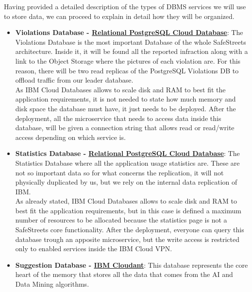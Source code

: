 Having provided a detailed description of the types of DBMS services we will use to store data, we can proceed to explain in detail how they will be organized.
\begin{itemize}
	\item \textbf{Violations Database - \href{https://cloud.ibm.com/catalog/services/databases-for-postgresql}{Relational PostgreSQL Cloud Database}}: The Violations Database is the most important Database of the whole SafeStreets architecture. Inside it, it will be found all the reported infraction along with a link to the Object Storage where the pictures of each violation are. For this reason, there will be two read replicas of the PostgreSQL Violations DB to offload traffic from our leader database. 
	\\As IBM Cloud Databases allows to scale disk and RAM to best fit the application requirements, it is not needed to state how much memory and disk space the database must have, it just needs to be deployed. After the deployment, all the microservice that needs to access data inside this database, will be given a connection string that allows read or read/write access depending on which service is.
	\begin{comment}
	\begin{figure}[h!]
		\makebox[\textwidth]{\texttt{[image: /images/microservices/postgres.png]}}
		\caption{Scalable SafeStreets architecture to handle millions of users.}
	\end{figure}
	\FloatBarrier
	\end{comment}
	\item \textbf{Statistics Database - \href{https://cloud.ibm.com/catalog/services/databases-for-postgresql}{Relational PostgreSQL Cloud Database}}: The Statistics Database where all the application usage statistics are. 
	These are not so important data so for what concerns the replication, it will not physically duplicated by us, but we rely on the internal data replication of IBM.
	\\As already stated, IBM Cloud Databases allows to scale disk and RAM to best fit the application requirements, but in this case is defined a maximum number of resources to be allocated because the statistics page is not a SafeStreets core functionality.
	After the deployment, everyone can query this database trough an apposite microservice, but the write access is restricted only to enabled services inside the IBM Cloud VPN.
	\item \textbf{Suggestion Database - \href{https://cloud.ibm.com/catalog/services/cloudant}{IBM Cloudant}}: This database represents the core heart of the memory that stores all the data that comes from the AI and Data Mining algorithms.

\end{itemize}

